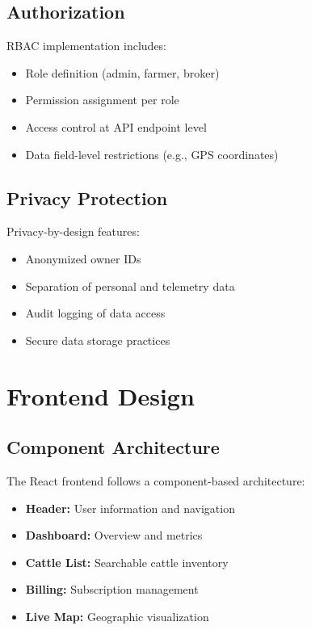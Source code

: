 \subsection{Authorization}

RBAC implementation includes:

\begin{itemize}
    \item Role definition (admin, farmer, broker)
    \item Permission assignment per role
    \item Access control at API endpoint level
    \item Data field-level restrictions (e.g., GPS coordinates)
\end{itemize}

\subsection{Privacy Protection}

Privacy-by-design features:

\begin{itemize}
    \item Anonymized owner IDs
    \item Separation of personal and telemetry data
    \item Audit logging of data access
    \item Secure data storage practices
\end{itemize}

\section{Frontend Design}

\subsection{Component Architecture}

The React frontend follows a component-based architecture:

\begin{itemize}
    \item \textbf{Header:} User information and navigation
    \item \textbf{Dashboard:} Overview and metrics
    \item \textbf{Cattle List:} Searchable cattle inventory
    \item \textbf{Billing:} Subscription management
    \item \textbf{Live Map:} Geographic visualization
\end{itemize}

